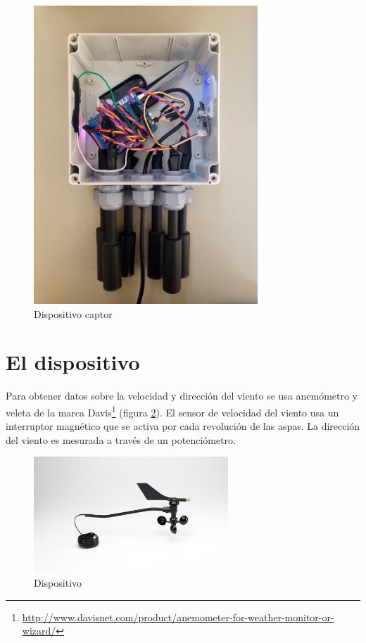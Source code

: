 \documentclass[a4paper, 11pt]{article}
\begin{document}
\begin{figure}[h]
\begin{minipage}{0.5\textwidth}
	\includegraphics[width=0.75\textwidth]{img/Captor2.jpg}
	\end{minipage}
\caption{Dispositivo captor}
\label{fig:captor}
\end{figure}
\newpage

\section{El dispositivo}
Para obtener datos sobre la velocidad y dirección del viento se usa anemómetro y veleta de la marca Davis\footnote{\url{http://www.davisnet.com/product/anemometer-for-weather-monitor-or-wizard/}} (figura \ref{fig:gadget}). El sensor de velocidad del viento usa un interruptor magnético que se activa por cada revolución de las aspas. La dirección del viento es mesurada a través de un potenciómetro.

\begin{figure}[h]
	\center
	\includegraphics[width=0.65\textwidth]{img/davis.jpg}
	\caption{Dispositivo}
	\label{fig:gadget}
\end{figure}
\end{document}
